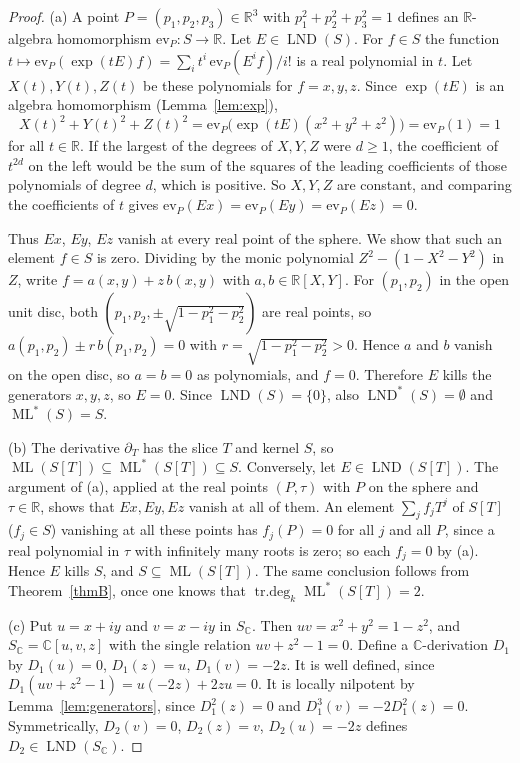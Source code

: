 \documentclass[11pt]{amsart}
\theoremstyle{definition}
\newcommand{\RR}{\mathbb{R}}
\newcommand{\CC}{\mathbb{C}}
\DeclareMathOperator{\ML}{ML}
\DeclareMathOperator{\LND}{LND}
\DeclareMathOperator{\trdeg}{tr.deg}
\newcommand{\MLs}{\ML^{*}}
\newcommand{\LNDs}{\LND^{*}}
\newcommand{\td}[1]{\trdeg_k #1}
\begin{document}
\begin{proof}
(a) A point $P=(p_1,p_2,p_3)\in\RR^3$ with $p_1^2+p_2^2+p_3^2=1$ defines an $\RR$-algebra homomorphism $\mathrm{ev}_P\colon S\to\RR$. Let $E\in\LND(S)$. For $f\in S$ the function $t\mapsto\mathrm{ev}_P(\exp(tE)f)=\sum_i t^i\,\mathrm{ev}_P(E^if)/i!$ is a real polynomial in $t$. Let $X(t),Y(t),Z(t)$ be these polynomials for $f=x,y,z$. Since $\exp(tE)$ is an algebra homomorphism (Lemma~\ref{lem:exp}),
\[
X(t)^2+Y(t)^2+Z(t)^2=\mathrm{ev}_P\bigl(\exp(tE)(x^2+y^2+z^2)\bigr)=\mathrm{ev}_P(1)=1
\]
for all $t\in\RR$. If the largest of the degrees of $X,Y,Z$ were $d\ge1$, the coefficient of $t^{2d}$ on the left would be the sum of the squares of the leading coefficients of those polynomials of degree $d$, which is positive. So $X,Y,Z$ are constant, and comparing the coefficients of $t$ gives $\mathrm{ev}_P(E x)=\mathrm{ev}_P(E y)=\mathrm{ev}_P(E z)=0$.

Thus $Ex$, $Ey$, $Ez$ vanish at every real point of the sphere. We show that such an element $f\in S$ is zero. Dividing by the monic polynomial $Z^2-(1-X^2-Y^2)$ in $Z$, write $f=a(x,y)+z\,b(x,y)$ with $a,b\in\RR[X,Y]$. For $(p_1,p_2)$ in the open unit disc, both $(p_1,p_2,\pm\sqrt{1-p_1^2-p_2^2})$ are real points, so $a(p_1,p_2)\pm r\,b(p_1,p_2)=0$ with $r=\sqrt{1-p_1^2-p_2^2}>0$. Hence $a$ and $b$ vanish on the open disc, so $a=b=0$ as polynomials, and $f=0$. Therefore $E$ kills the generators $x,y,z$, so $E=0$. Since $\LND(S)=\{0\}$, also $\LNDs(S)=\emptyset$ and $\MLs(S)=S$.

(b) The derivative $\partial_T$ has the slice $T$ and kernel $S$, so $\ML(S[T])\subseteq\MLs(S[T])\subseteq S$. Conversely, let $E\in\LND(S[T])$. The argument of (a), applied at the real points $(P,\tau)$ with $P$ on the sphere and $\tau\in\RR$, shows that $Ex,Ey,Ez$ vanish at all of them. An element $\sum_jf_jT^j$ of $S[T]$ ($f_j\in S$) vanishing at all these points has $f_j(P)=0$ for all $j$ and all $P$, since a real polynomial in $\tau$ with infinitely many roots is zero; so each $f_j=0$ by (a). Hence $E$ kills $S$, and $S\subseteq\ML(S[T])$. The same conclusion follows from Theorem~\ref{thmB}, once one knows that $\td{\MLs(S[T])}=2$.

(c) Put $u=x+iy$ and $v=x-iy$ in $S_\CC$. Then $uv=x^2+y^2=1-z^2$, and $S_\CC=\CC[u,v,z]$ with the single relation $uv+z^2-1=0$. Define a $\CC$-derivation $D_1$ by $D_1(u)=0$, $D_1(z)=u$, $D_1(v)=-2z$. It is well defined, since $D_1(uv+z^2-1)=u(-2z)+2zu=0$. It is locally nilpotent by Lemma~\ref{lem:generators}, since $D_1^2(z)=0$ and $D_1^3(v)=-2D_1^2(z)=0$. Symmetrically, $D_2(v)=0$, $D_2(z)=v$, $D_2(u)=-2z$ defines $D_2\in\LND(S_\CC)$.


\end{proof}
\end{document}

